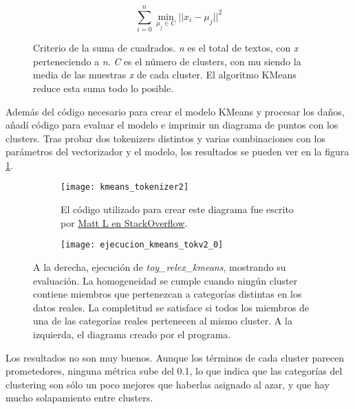 \documentclass{pre-tfg}
\begin{document}
\begin{figure}[h]
	\begin{equation}
	\sum_{i=0}^{n}\min_{\mu_j \in C}{||x_i - \mu_j ||^2}
	\label{for:ineria}
	\end{equation}
	\caption{Criterio de la suma de cuadrados. \textit{n} es el total de textos, con \textit{x} perteneciendo a \textit{n}. \textit{C} es el número de clusters, con mu siendo la media de las muestras \textit{x} de cada cluster. El algoritmo KMeans reduce esta suma todo lo posible.}
	
\end{figure}

Además del código necesario para crear el modelo KMeans y procesar los daños, añadí código para evaluar el modelo e imprimir un diagrama de puntos con los clusters. Tras probar dos tokenizers distintos y varias combinaciones con los parámetros del vectorizador y el modelo, los resultados se pueden ver en la figura \ref{fig:kmeanresult}.

\begin{figure}[!h]
	\centering
	
	\begin{subfigure}{.4\textwidth}
		\texttt{[image: kmeans\_tokenizer2]}
		\caption[aaaaa]{El código utilizado para crear este diagrama fue escrito por \href{https://stackoverflow.com/questions/57626286/how-to-plot-text-clusters}{Matt L en StackOverflow}\protect\footnotemark.}
	\end{subfigure}%
	\begin{subfigure}{.5\textwidth}
		\centering
		\texttt{[image: ejecucion\_kmeans\_tokv2\_0]}
	\end{subfigure}
		
	\caption{A la derecha, ejecución de \textit{toy\_relex\_kmeans}, mostrando su evaluación. La homogeneidad se cumple cuando ningún cluster contiene miembros que pertenezcan a categorías distintas en los datos reales. La completitud se satisface si todos los miembros de una de las categorías reales pertenecen al mismo cluster. A la izquierda, el diagrama creado por el programa.}
	\label{fig:kmeanresult}
\end{figure}



Los resultados no son muy buenos. Aunque los términos de cada cluster parecen prometedores, ninguna métrica sube del 0.1, lo que indica que las categorías del clustering son sólo un poco mejores que haberlas asignado al azar, y que hay mucho solapamiento entre clusters.
\end{document}
